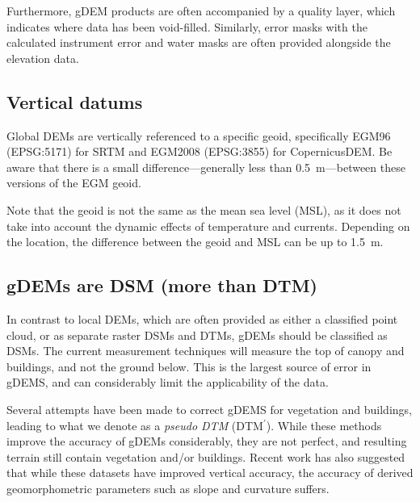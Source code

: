 %

Furthermore, gDEM products are often accompanied by a quality layer, which indicates where data has been void-filled.
Similarly, error masks with the calculated instrument error and water masks are often provided alongside the elevation data.





\subsection{Vertical datums}

Global DEMs are vertically referenced to a specific geoid, specifically EGM96 (EPSG:5171) for SRTM and EGM2008 (EPSG:3855) for CopernicusDEM\@.%
Be aware that there is a small difference---generally less than \qty{0.5}{m}---between these versions of the EGM geoid.

Note that the geoid is not the same as the mean sea level (MSL),%
as it does not take into account the dynamic effects of temperature and currents.
Depending on the location, the difference between the geoid and MSL can be up to \qty{1.5}{m}.


\subsection{gDEMs are DSM (more than DTM)}

In contrast to local DEMs, which are often provided as either a classified point cloud, or as separate raster DSMs and DTMs, gDEMs should be classified as DSMs.
The current measurement techniques will measure the top of canopy and buildings, and not the ground below.
This is the largest source of error in gDEMS, and can considerably limit the applicability of the data.

%

Several attempts have been made to correct gDEMS for vegetation and buildings, leading to what we denote as a \emph{pseudo DTM} (DTM$^{\prime}$).
While these methods improve the accuracy of gDEMs considerably, they are not perfect, and resulting terrain still contain vegetation and/or buildings.
Recent work has also suggested that while these datasets have improved vertical accuracy, the accuracy of derived geomorphometric parameters such as slope and curvature suffers.

